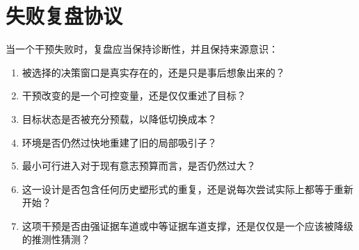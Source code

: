 \section{失败复盘协议}

当一个干预失败时，复盘应当保持诊断性，并且保持来源意识：
\begin{enumerate}[nosep]
  \item 被选择的决策窗口是真实存在的，还是只是事后想象出来的？
  \item 干预改变的是一个可控变量，还是仅仅重述了目标？
  \item 目标状态是否被充分预载，以降低切换成本？
  \item 环境是否仍然过快地重建了旧的局部吸引子？
  \item 最小可行进入对于现有意志预算而言，是否仍然过大？
  \item 这一设计是否包含任何历史塑形式的重复，还是说每次尝试实际上都等于重新开始？
  \item 这项干预是否由强证据车道或中等证据车道支撑，还是仅仅是一个应该被降级的推测性猜测？
\end{enumerate}